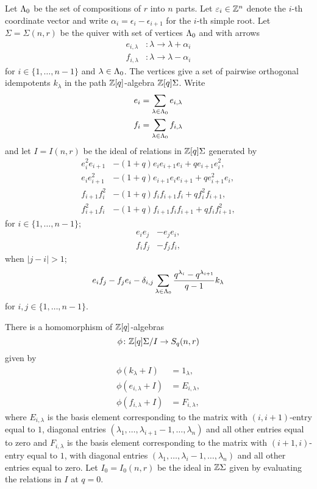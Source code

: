 \documentclass[a4paper, 11pt, twoside]{report}
\begin{document}
Let $\Lambda_0{}$ be the set of compositions of $r$ into $n$ parts. Let $\varepsilon_i\in\mathbb{Z}^n$ denote the $i$-th coordinate vector and write $\alpha_i=\epsilon_i - \epsilon_{i+1}$ for the $i$-th simple root. Let $\Sigma=\Sigma(n,r)$ be the quiver with set of vertices $\Lambda_0{}$ and with arrows
\begin{align*}
e_{i,\lambda}&\colon\lambda\to\lambda+\alpha_i\\
f_{i,\lambda}&\colon\lambda\to\lambda-\alpha_i
\end{align*}
for $i\in\{1,\ldots,n-1\}$ and $\lambda\in\Lambda_0{}$. The vertices give a set of pairwise orthogonal idempotents $k_\lambda$ in the path $\mathbb{Z}[q]$-algebra $\mathbb{Z}[q]\Sigma$. Write
\begin{align*}
e_i &= \sum_{\lambda\in\Lambda_0{}} e_{i,\lambda}\\
f_i &= \sum_{\lambda\in\Lambda_0{}} f_{i,\lambda}
\end{align*}
and let $I=I(n,r)$ be the ideal of relations in $\mathbb{Z}[q]\Sigma$ generated by
\begin{align*}
e_i^2e_{i+1} &-(1+q)e_ie_{i+1}e_i +qe_{i+1}e_i^2,\\
e_ie_{i+1}^2 &-(1+q)e_{i+1}e_ie_{i+1} +qe_{i+1}^2e_i,\\
f_{i+1}f_i^2 &-(1+q)f_if_{i+1}f_i +qf_i^2f_{i+1},\\
f_{i+1}^2f_i &-(1+q)f_{i+1}f_if_{i+1} +qf_if_{i+1}^2,
\end{align*}
for $i\in\{1,\ldots,n-1\}$;
\begin{align*}
e_ie_j &- e_je_i,\\
f_if_j &- f_jf_i,
\end{align*}
when $|j-i|>1$;
\begin{equation*}
e_if_j - f_je_i -\delta_{i,j}\sum_{\lambda\in\Lambda_0{}} \frac{q^{\lambda_i}-q^{\lambda_{i+1}}}{q-1} k_\lambda
\end{equation*}
for $i,j\in\{1,\ldots,n-1\}$.

There is a homomorphism of $\mathbb{Z}[q]$-algebras
\begin{equation*}
\phi\colon\mathbb{Z}[q]\Sigma/{I}\to S_q(n,r)
\end{equation*}
given by
\begin{align*}
\phi(k_\lambda + I) &= 1_\lambda,\\
\phi(e_{i,\lambda} +I) &= E_{i,\lambda},\\ 
\phi(f_{i,\lambda} +I) &= F_{i,\lambda},
\end{align*}
where $E_{i,\lambda}$ is the basis element corresponding to the matrix with $(i,i+1)$-entry equal to $1$, diagonal entries $(\lambda_1,\ldots,\lambda_{i+1}-1,\ldots,\lambda_n)$ and all other entries equal to zero and $F_{i,\lambda}$ is the basis element corresponding to the matrix with $(i+1,i)$-entry equal to $1$, with diagonal entries $(\lambda_1,\ldots,\lambda_i-1,\ldots,\lambda_n)$ and all other entries equal to zero. Let $I_0=I_0(n,r)$ be the ideal in $\mathbb{Z}\Sigma$ given by evaluating the relations in $I$ at $q=0$.
\end{document}

